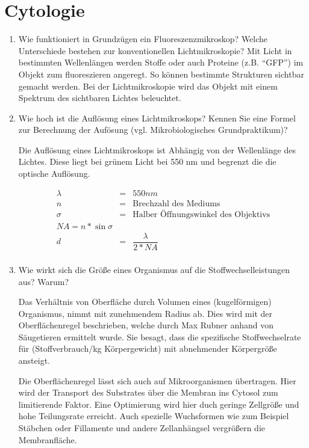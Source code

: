 
\section{Cytologie}
\label{sec:cytologie}
\begin{enumerate}
	\item Wie funktioniert in Grundzügen ein Fluoreszenzmikroskop? Welche Unterschiede bestehen zur konventionellen Lichtmikroskopie?				
		Mit Licht in bestimmten Wellenlängen werden Stoffe
		oder auch Proteine (z.B. ``GFP'') im Objekt zum	fluoreszieren angeregt.
		So können bestimmte Strukturen sichtbar gemacht werden.
		Bei der Lichtmikroskopie wird das Objekt mit einem Spektrum des sichtbaren Lichtes
		beleuchtet.

	\item\label{tab:quest_cyt_resolution} Wie hoch ist die Auflösung eines Lichtmikroskops?
		Kennen Sie eine Formel zur Berechnung der Aufösung (vgl. Mikrobiologisches Grundpraktikum)?

	Die Auflösung eines Lichtmikroskops ist Abhängig von der Wellenlänge des Lichtes.
	Diese liegt bei grünem Licht bei 550 nm und begrenzt die die optische Auflösung.

	\begin{center}
	\begin{eqnarray*}
		\lambda &=& 550 nm \\
		n &=& \text{Brechzahl des Mediums} \\
		\sigma &=& \text{Halber \"Offnungswinkel des Objektivs} \\
		NA = n * \sin{\sigma}\\
		d &=& \dfrac{\lambda}{2*NA} \\
	\end{eqnarray*}
	\end{center}

	\item Wie wirkt sich die Größe eines Organismus auf die Stoffwechselleistungen aus? Warum?
		
		Das Verhältnis von Oberfläche durch Volumen eines (kugelförmigen) Organismus,
		nimmt mit zunehmendem Radius ab.
		Dies wird mit der Oberflächenregel beschrieben, welche durch Max Rubner anhand von Säugetieren ermittelt wurde.
		Sie besagt, dass die spezifische Stoffwechselrate für (Stoffverbrauch/kg Körpergewicht)
		mit abnehmender Körpergröße ansteigt.

		Die Oberflächenregel lässt sich auch auf Mikroorganismen übertragen.
		Hier wird der Transport des Substrates über die Membran ins Cytosol zum limitierende Faktor.
		Eine Optimierung wird hier duch geringe Zellgröße und hohe Teilungsrate erreicht.
		Auch spezielle Wuchsformen wie zum Beispiel Stäbchen
		oder Fillamente und andere Zellanhängsel vergrößern die Membranfläche.


\end{enumerate}
